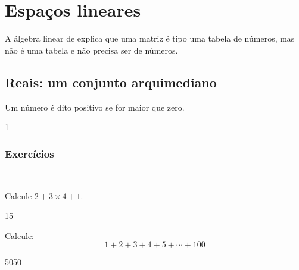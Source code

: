 
\setlength{\headheight}{30pt} %
\chapter{Espaços lineares}\label{cap_introducao}
A álgebra linear de explica que uma matriz é tipo uma tabela de números, mas não é uma tabela e não precisa ser de números.

\section{Reais: um conjunto arquimediano}\label{sec_def_trans_lap}

\begin{defn}
    Um número é dito positivo se for maior que zero.
\end{defn}

1

\subsection*{Exercícios}
~
\begin{exer} Calcule $2 + 3\times 4 + 1$.
\end{exer}
\begin{resp}
15
\end{resp}

\begin{exer} Calcule:
    \begin{equation}
        1 + 2 + 3 + 4 + 5 + \cdots + 100
    \end{equation}
\end{exer}
\begin{resp}
    5050
\end{resp}
    
